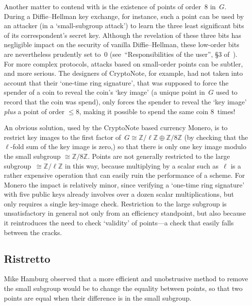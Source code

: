 \documentclass{amsproc}
\newcommand{\Z}{\mathbb{Z}}
\begin{document}
Another matter to contend with
is the existence of points of order~$8$ in~$G$.
During a Diffie--Hellman key exchange, for instance,
such a point can be used by an attacker
(in a `small-subgroup attack')
to learn the three least significant
bits of its correspondent's secret key.
Although the revelation of these three bits has
negligible impact on the security of vanilla Diffie--Hellman,
these low-order bits are nevertheless prudently set to~$0$
(see~``Responsibilities of the user'', \S3 of~\cite{x25519}).
For more complex protocols,
attacks based on small-order points
can be subtler, and more serious.
The designers of CryptoNote\cite{cryptonote},
for example,
had not taken into account\cite{monero-disclosure,monero-curves-post}
that
their `one-time ring signature',
that was supposed to force the spender of a coin
to reveal the coin's `key image'
(a unique point in~$G$ used to record that the coin was spend),
only forces the spender to reveal
the `key image' \emph{plus} a point of order $\leq 8$,
making it possible to spend the same coin 8~times!

An obvious solution,
used by the CryptoNote based 
currency Monero\cite{monero-fix},
is to restrict
key images
to the first factor of~$G\cong \Z/\ell\Z \oplus \Z/8\Z$
(by checking that the $\ell$-fold sum of the key image is zero,)
so that there is only one key image modulo
the small subgroup $\cong \Z/8\Z$.
Points are not generally restricted to
the large subgroup~$\cong \Z/\ell\Z$ in this way,
because multiplying by a scalar such as~$\ell$
is a rather expensive operation
that can easily ruin the performance of a scheme.
For Monero the impact is relatively minor,
since verifying a `one-time ring signature' with five
public keys already involves over a dozen scalar multiplications,
but only requires a single key-image check.
Restriction to the large subgroup is unsatisfactory in general not only from 
an efficiency standpoint, but also because it reintroduces
the need to check `validity' of points---a check that easily
falls between the cracks.

\subsection{Ristretto}
Mike Hamburg observed that a more
efficient and
unobstrusive
method to remove the small subgroup
would be to change the equality between points,
so that two points are equal when 
their difference is in the small subgroup.
\end{document}
